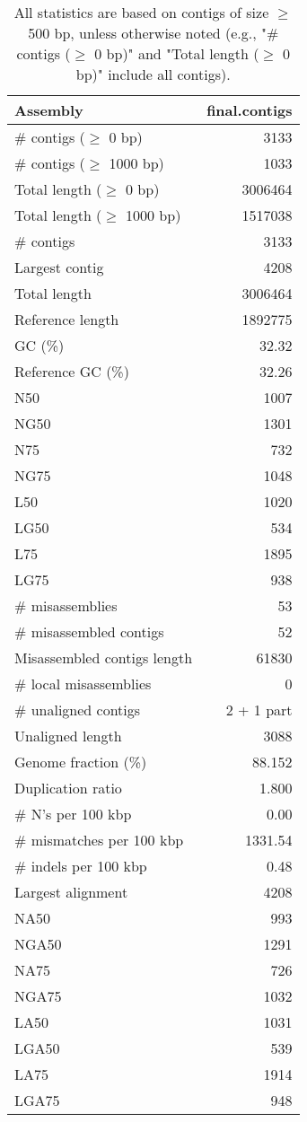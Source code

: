 \documentclass[12pt,a4paper]{article}
\begin{document}
\begin{table}[ht]
\begin{center}
\caption{All statistics are based on contigs of size $\geq$ 500 bp, unless otherwise noted (e.g., "\# contigs ($\geq$ 0 bp)" and "Total length ($\geq$ 0 bp)" include all contigs).}
\begin{tabular}{|l*{1}{|r}|}
\hline
Assembly & final.contigs \\ \hline
\# contigs ($\geq$ 0 bp) & 3133 \\ \hline
\# contigs ($\geq$ 1000 bp) & 1033 \\ \hline
Total length ($\geq$ 0 bp) & 3006464 \\ \hline
Total length ($\geq$ 1000 bp) & 1517038 \\ \hline
\# contigs & 3133 \\ \hline
Largest contig & 4208 \\ \hline
Total length & 3006464 \\ \hline
Reference length & 1892775 \\ \hline
GC (\%) & 32.32 \\ \hline
Reference GC (\%) & 32.26 \\ \hline
N50 & 1007 \\ \hline
NG50 & 1301 \\ \hline
N75 & 732 \\ \hline
NG75 & 1048 \\ \hline
L50 & 1020 \\ \hline
LG50 & 534 \\ \hline
L75 & 1895 \\ \hline
LG75 & 938 \\ \hline
\# misassemblies & 53 \\ \hline
\# misassembled contigs & 52 \\ \hline
Misassembled contigs length & 61830 \\ \hline
\# local misassemblies & 0 \\ \hline
\# unaligned contigs & 2 + 1 part \\ \hline
Unaligned length & 3088 \\ \hline
Genome fraction (\%) & 88.152 \\ \hline
Duplication ratio & 1.800 \\ \hline
\# N's per 100 kbp & 0.00 \\ \hline
\# mismatches per 100 kbp & 1331.54 \\ \hline
\# indels per 100 kbp & 0.48 \\ \hline
Largest alignment & 4208 \\ \hline
NA50 & 993 \\ \hline
NGA50 & 1291 \\ \hline
NA75 & 726 \\ \hline
NGA75 & 1032 \\ \hline
LA50 & 1031 \\ \hline
LGA50 & 539 \\ \hline
LA75 & 1914 \\ \hline
LGA75 & 948 \\ \hline
\end{tabular}
\end{center}
\end{table}
\end{document}

